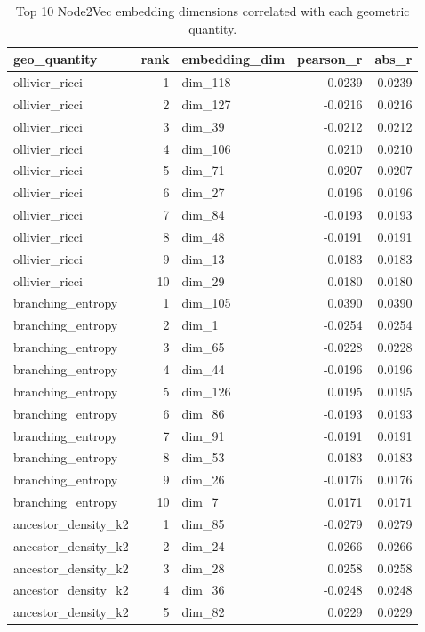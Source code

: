 \begin{table}
\caption{Top 10 Node2Vec embedding dimensions correlated with each geometric quantity.}
\label{tab:geo-embedding-correlations}
\begin{tabular}{lrlrr}
\toprule
geo_quantity & rank & embedding_dim & pearson_r & abs_r \\
\midrule
ollivier_ricci & 1 & dim_118 & -0.0239 & 0.0239 \\
ollivier_ricci & 2 & dim_127 & -0.0216 & 0.0216 \\
ollivier_ricci & 3 & dim_39 & -0.0212 & 0.0212 \\
ollivier_ricci & 4 & dim_106 & 0.0210 & 0.0210 \\
ollivier_ricci & 5 & dim_71 & -0.0207 & 0.0207 \\
ollivier_ricci & 6 & dim_27 & 0.0196 & 0.0196 \\
ollivier_ricci & 7 & dim_84 & -0.0193 & 0.0193 \\
ollivier_ricci & 8 & dim_48 & -0.0191 & 0.0191 \\
ollivier_ricci & 9 & dim_13 & 0.0183 & 0.0183 \\
ollivier_ricci & 10 & dim_29 & 0.0180 & 0.0180 \\
branching_entropy & 1 & dim_105 & 0.0390 & 0.0390 \\
branching_entropy & 2 & dim_1 & -0.0254 & 0.0254 \\
branching_entropy & 3 & dim_65 & -0.0228 & 0.0228 \\
branching_entropy & 4 & dim_44 & -0.0196 & 0.0196 \\
branching_entropy & 5 & dim_126 & 0.0195 & 0.0195 \\
branching_entropy & 6 & dim_86 & -0.0193 & 0.0193 \\
branching_entropy & 7 & dim_91 & -0.0191 & 0.0191 \\
branching_entropy & 8 & dim_53 & 0.0183 & 0.0183 \\
branching_entropy & 9 & dim_26 & -0.0176 & 0.0176 \\
branching_entropy & 10 & dim_7 & 0.0171 & 0.0171 \\
ancestor_density_k2 & 1 & dim_85 & -0.0279 & 0.0279 \\
ancestor_density_k2 & 2 & dim_24 & 0.0266 & 0.0266 \\
ancestor_density_k2 & 3 & dim_28 & 0.0258 & 0.0258 \\
ancestor_density_k2 & 4 & dim_36 & -0.0248 & 0.0248 \\
ancestor_density_k2 & 5 & dim_82 & 0.0229 & 0.0229 \\

\end{tabular}
\end{table}
